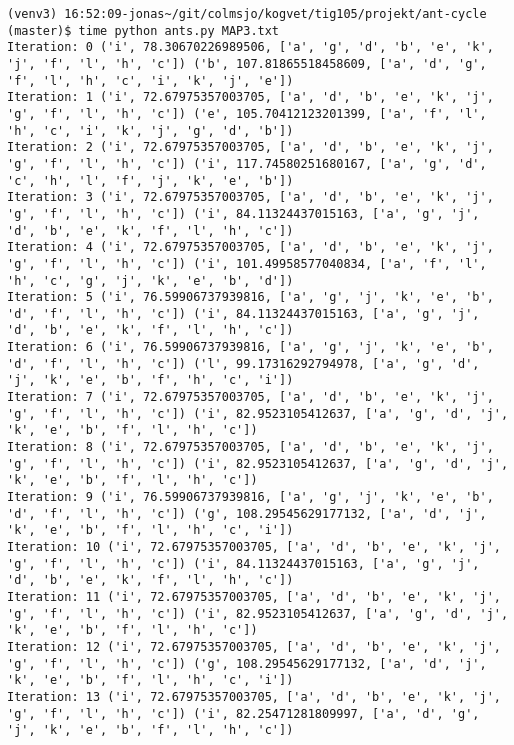\documentclass[english,man]{apa6}
\begin{document}
\begin{verbatim}
(venv3) 16:52:09-jonas~/git/colmsjo/kogvet/tig105/projekt/ant-cycle (master)$ time python ants.py MAP3.txt
Iteration: 0 ('i', 78.30670226989506, ['a', 'g', 'd', 'b', 'e', 'k', 'j', 'f', 'l', 'h', 'c']) ('b', 107.81865518458609, ['a', 'd', 'g', 'f', 'l', 'h', 'c', 'i', 'k', 'j', 'e'])
Iteration: 1 ('i', 72.67975357003705, ['a', 'd', 'b', 'e', 'k', 'j', 'g', 'f', 'l', 'h', 'c']) ('e', 105.70412123201399, ['a', 'f', 'l', 'h', 'c', 'i', 'k', 'j', 'g', 'd', 'b'])
Iteration: 2 ('i', 72.67975357003705, ['a', 'd', 'b', 'e', 'k', 'j', 'g', 'f', 'l', 'h', 'c']) ('i', 117.74580251680167, ['a', 'g', 'd', 'c', 'h', 'l', 'f', 'j', 'k', 'e', 'b'])
Iteration: 3 ('i', 72.67975357003705, ['a', 'd', 'b', 'e', 'k', 'j', 'g', 'f', 'l', 'h', 'c']) ('i', 84.11324437015163, ['a', 'g', 'j', 'd', 'b', 'e', 'k', 'f', 'l', 'h', 'c'])
Iteration: 4 ('i', 72.67975357003705, ['a', 'd', 'b', 'e', 'k', 'j', 'g', 'f', 'l', 'h', 'c']) ('i', 101.49958577040834, ['a', 'f', 'l', 'h', 'c', 'g', 'j', 'k', 'e', 'b', 'd'])
Iteration: 5 ('i', 76.59906737939816, ['a', 'g', 'j', 'k', 'e', 'b', 'd', 'f', 'l', 'h', 'c']) ('i', 84.11324437015163, ['a', 'g', 'j', 'd', 'b', 'e', 'k', 'f', 'l', 'h', 'c'])
Iteration: 6 ('i', 76.59906737939816, ['a', 'g', 'j', 'k', 'e', 'b', 'd', 'f', 'l', 'h', 'c']) ('l', 99.17316292794978, ['a', 'g', 'd', 'j', 'k', 'e', 'b', 'f', 'h', 'c', 'i'])
Iteration: 7 ('i', 72.67975357003705, ['a', 'd', 'b', 'e', 'k', 'j', 'g', 'f', 'l', 'h', 'c']) ('i', 82.9523105412637, ['a', 'g', 'd', 'j', 'k', 'e', 'b', 'f', 'l', 'h', 'c'])
Iteration: 8 ('i', 72.67975357003705, ['a', 'd', 'b', 'e', 'k', 'j', 'g', 'f', 'l', 'h', 'c']) ('i', 82.9523105412637, ['a', 'g', 'd', 'j', 'k', 'e', 'b', 'f', 'l', 'h', 'c'])
Iteration: 9 ('i', 76.59906737939816, ['a', 'g', 'j', 'k', 'e', 'b', 'd', 'f', 'l', 'h', 'c']) ('g', 108.29545629177132, ['a', 'd', 'j', 'k', 'e', 'b', 'f', 'l', 'h', 'c', 'i'])
Iteration: 10 ('i', 72.67975357003705, ['a', 'd', 'b', 'e', 'k', 'j', 'g', 'f', 'l', 'h', 'c']) ('i', 84.11324437015163, ['a', 'g', 'j', 'd', 'b', 'e', 'k', 'f', 'l', 'h', 'c'])
Iteration: 11 ('i', 72.67975357003705, ['a', 'd', 'b', 'e', 'k', 'j', 'g', 'f', 'l', 'h', 'c']) ('i', 82.9523105412637, ['a', 'g', 'd', 'j', 'k', 'e', 'b', 'f', 'l', 'h', 'c'])
Iteration: 12 ('i', 72.67975357003705, ['a', 'd', 'b', 'e', 'k', 'j', 'g', 'f', 'l', 'h', 'c']) ('g', 108.29545629177132, ['a', 'd', 'j', 'k', 'e', 'b', 'f', 'l', 'h', 'c', 'i'])
Iteration: 13 ('i', 72.67975357003705, ['a', 'd', 'b', 'e', 'k', 'j', 'g', 'f', 'l', 'h', 'c']) ('i', 82.25471281809997, ['a', 'd', 'g', 'j', 'k', 'e', 'b', 'f', 'l', 'h', 'c'])

\end{verbatim}
\end{document}
